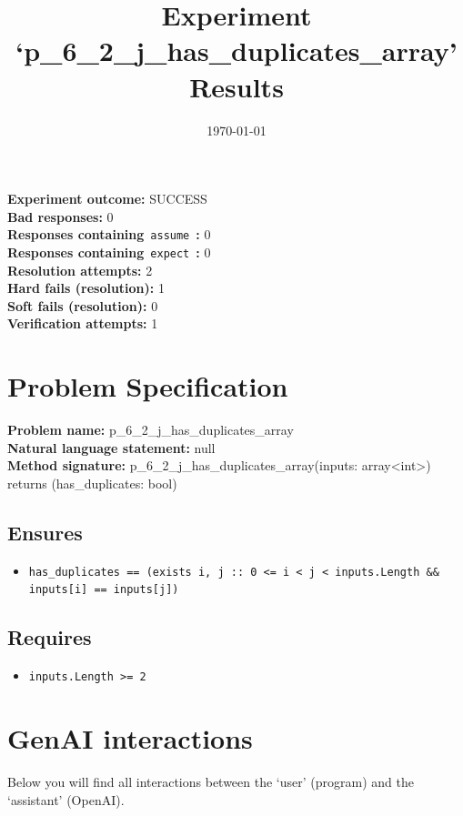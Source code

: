 \documentclass{article}
\begin{document}
\title{Experiment `p\_6\_2\_j\_has\_duplicates\_array' Results}
\author{\today}
\date{}
\maketitle
\textbf{Experiment outcome: }SUCCESS
\\\textbf{Bad responses: }0
\\\textbf{Responses containing}~\texttt{assume}~\textbf{: }0
\\\textbf{Responses containing}~\texttt{expect}~\textbf{: }0
\\\textbf{Resolution attempts: }2
\\\textbf{Hard fails (resolution): }1
\\\textbf{Soft fails (resolution): }0
\\\textbf{Verification attempts: }1
\section*{Problem Specification}
\textbf{Problem name: }p\_6\_2\_j\_has\_duplicates\_array
\\\textbf{Natural language statement: }null
\\\textbf{Method signature: }p\_6\_2\_j\_has\_duplicates\_array(inputs: array<int>) returns (has\_duplicates: bool)
\subsection*{Ensures}
\begin{itemize}
\item \texttt{has\_duplicates == (exists i, j :: 0 <= i < j < inputs.Length \&\& inputs[i] == inputs[j])}
\end{itemize}
\subsection*{Requires}
\begin{itemize}
\item \texttt{inputs.Length >= 2}
\end{itemize}
\clearpage
\section*{GenAI interactions}
Below you will find all interactions between the `user' (program) and the `assistant' (OpenAI).
\end{document}
